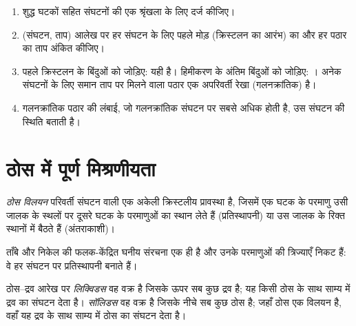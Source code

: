 \begin{method}[शीतलन वक्रों से आरेख बनाना]\label{met:b2:solid-liquid-diagrams:diagram-from-curves}
\begin{enumerate}
  \item शुद्ध घटकों सहित संघटनों की एक श्रृंखला के लिए 
        दर्ज कीजिए।
  \item (संघटन, ताप) आलेख पर हर संघटन के लिए पहले मोड़ (क्रिस्टलन का
        आरंभ) का और हर पठार का ताप
        अंकित कीजिए।
  \item पहले क्रिस्टलन के बिंदुओं को जोड़िए: यही  है। हिमीकरण के
        अंतिम बिंदुओं को जोड़िए: । अनेक संघटनों के लिए समान ताप पर मिलने वाला
        पठार एक अपरिवर्ती रेखा (गलनक्रांतिक) है।
  \item गलनक्रांतिक पठार की लंबाई, जो गलनक्रांतिक संघटन पर
        सबसे अधिक होती है, उस संघटन की स्थिति बताती है।
\end{enumerate}
\end{method}

\section{ठोस में पूर्ण मिश्रणीयता}

\begin{definition}[ठोस विलयन]\label{def:b2:solid-liquid-diagrams:solid-solution}
\emph{ठोस विलयन} परिवर्ती संघटन वाली एक अकेली क्रिस्टलीय प्रावस्था
है, जिसमें एक घटक के परमाणु उसी जालक के स्थलों पर दूसरे घटक के परमाणुओं का
स्थान लेते हैं (प्रतिस्थापनी) या उस जालक के रिक्त स्थानों में बैठते हैं
(अंतराकाशी)।
\end{definition}

ताँबे और निकेल की फलक-केंद्रित घनीय संरचना एक ही है और उनके परमाणुओं की
त्रिज्याएँ निकट हैं: वे हर संघटन पर प्रतिस्थापनी  बनाते हैं।

\begin{definition}[लिक्विडस और सॉलिडस]\label{def:b2:solid-liquid-diagrams:liquidus}
ठोस--द्रव आरेख पर \emph{लिक्विडस} वह वक्र है
जिसके ऊपर सब कुछ द्रव है; यह किसी ठोस के साथ साम्य में द्रव का संघटन
देता है। \emph{सॉलिडस} वह वक्र है जिसके नीचे
सब कुछ ठोस है; जहाँ ठोस एक विलयन है, वहाँ यह द्रव के साथ साम्य में ठोस का
संघटन देता है।
\end{definition}

